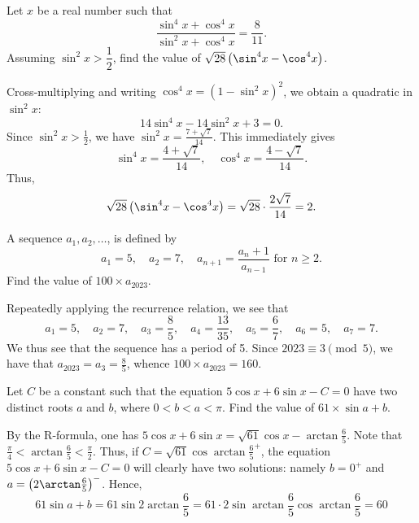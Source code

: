 \begin{question}[2]\label{Q::2023-S-1-13}
    Let $x$ be a real number such that \[\frac{\sin^4 x + \cos^4 x}{\sin^2 x + \cos^4 x} = \frac8{11}.\] Assuming $\sin^2 x > \dfrac12$, find the value of $\sqrt{28} \bp{\sin^4 x - \cos^4 x}$.
\end{question}
\begin{solution*}
    Cross-multiplying and writing $\cos^4 x = (1-\sin^2 x)^2$, we obtain a quadratic in $\sin^2 x$: \[14\sin^4 x - 14\sin^2 x + 3 = 0.\] Since $\sin^2 x > \frac12$, we have $\sin^2 x = \frac{7 + \sqrt{7}}{14}$. This immediately gives \[\sin^4 x = \frac{4 + \sqrt7}{14}, \quad \cos^4 x = \frac{4 - \sqrt7}{14}.\] Thus, \[\sqrt{28} \bp{\sin^4 x - \cos^4 x} = \sqrt{28} \cdot \frac{2\sqrt7}{14} = 2.\]
\end{solution*}

\begin{question}[160]\label{Q::2023-S-1-14}
    A sequence $a_1, a_2, \ldots$, is defined by \[a_1 = 5, \quad a_2 = 7, \quad a_{n+1} = \frac{a_n + 1}{a_{n-1}} \text{ for $n \geq 2$}.\] Find the value of $100 \times a_{2023}$.
\end{question}
\begin{solution*}
    Repeatedly applying the recurrence relation, we see that \[a_1 = 5, \quad a_2 =7, \quad a_3 = \frac85, \quad a_4 = \frac{13}{35}, \quad a_5 = \frac67, \quad a_6 = 5, \quad a_7 = 7.\] We thus see that the sequence has a period of 5. Since $2023 \equiv 3 \pmod{5}$, we have that $a_{2023} = a_3 = \frac85$, whence $100 \times a_{2023} = 160$.
\end{solution*}

\clearpage
\begin{question}[60]\label{Q::2023-S-1-15}
    Let $C$ be a constant such that the equation $5\cos x + 6 \sin x - C = 0$ have two distinct roots $a$ and $b$, where $0 < b < a < \pi$. Find the value of $61 \times \sin{a + b}$.
\end{question}
\begin{solution*}
    By the R-formula, one has $5\cos x + 6\sin x = \sqrt{61} \cos{x - \arctan \frac65}$. Note that $\frac\pi4 < \arctan{\frac65} < \frac\pi2$. Thus, if $C = \sqrt{61}\cos{\arctan \frac65}^+$, the equation $5\cos x + 6\sin x - C = 0$ will clearly have two solutions: namely $b = 0^+$ and $a = \bp{2\arctan \frac65}^-$. Hence, \[61 \sin{a + b} = 61\sin{2\arctan \frac65} = 61 \cdot 2 \sin{\arctan \frac65}\cos{\arctan\frac65} = 60 \]
\end{solution*}

